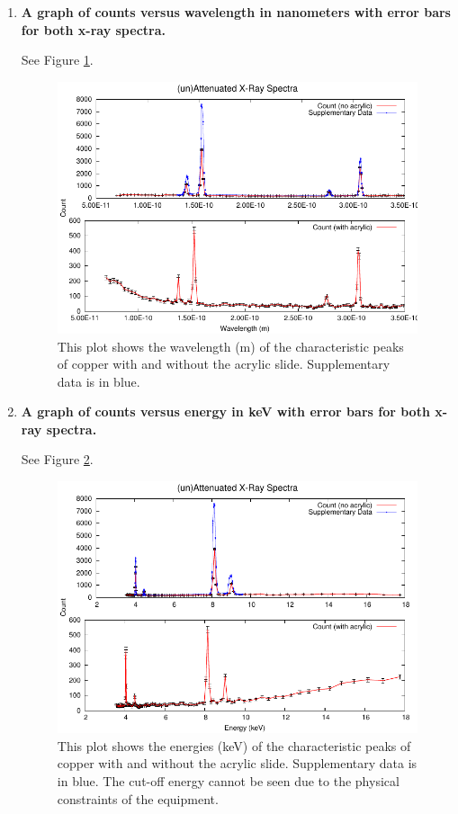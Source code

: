 \documentclass[justified]{tufte-book}
\begin{document}
\begin{enumerate}
\item {\bf A graph of counts versus wavelength in nanometers with error bars for both x-ray spectra.}\newline

See Figure \ref{fig:xrcg2}.

\begin{figure}
\includegraphics{XRaySpec-Wavelength.pdf}
\caption{This plot shows the wavelength (m) of the characteristic peaks of copper with and without the acrylic slide. Supplementary data is in blue.}
\label{fig:xrcg2}
\end{figure}

\item {\bf A graph of counts versus energy in keV with error bars for both x-ray spectra.}\newline

See Figure \ref{fig:xrcg3}.

\begin{figure}
\includegraphics{XRaySpec-Energy.pdf}
\caption{This plot shows the energies (keV) of the characteristic peaks of copper with and without the acrylic slide. Supplementary data is in blue. The cut-off energy cannot be seen due to the physical constraints of the equipment. }
\label{fig:xrcg3}
\end{figure}


\end{enumerate}
\end{document}
